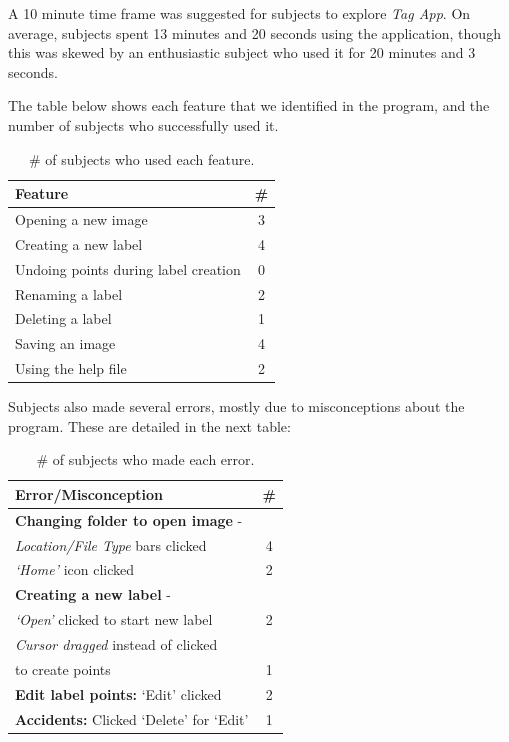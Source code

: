 \documentclass[11pt,twocolumn]{article}
\begin{document}
A 10 minute time frame was suggested for subjects to explore \emph{Tag App}. On average, subjects spent 13 minutes and 20 seconds using the application, though this was skewed by an enthusiastic subject who used it for 20 minutes and 3 seconds.

The table below shows each feature that we identified in the program, and the number of subjects who successfully used it.

\begin{table}[h!]
\centering
\begin{tabular}{|l|c|}
\hline
{\bf Feature } & {\bf \# } \\ 
\hline
Opening a new image & 3 \\
Creating a new label & 4 \\
Undoing points during label creation & 0 \\
Renaming a label & 2 \\
Deleting a label & 1 \\
Saving an image & 4 \\
Using the help file & 2 \\
\hline
\end{tabular}
\caption{\# of subjects who used each feature.}
\label{features}
\end{table}
 
Subjects also made several errors, mostly due to misconceptions about the program. These are detailed in the next table:

\begin{table}[h!]
\centering
\begin{tabular}{|l|c|}
\hline
{\bf Error/Misconception} & {\bf \#} \\
\hline
{\bf Changing folder to open image} - & \\
\emph{Location/File Type} bars clicked & 4 \\
\emph{`Home'} icon clicked & 2 \\
\hline
{\bf Creating a new label} - & \\
\emph{`Open'} clicked to start new label & 2 \\
\emph{Cursor dragged} instead of clicked & \\
to create points & 1 \\
\hline
{\bf Edit label points:} `Edit' clicked & 2 \\
\hline
{\bf Accidents:} Clicked `Delete' for `Edit' & 1 \\
\hline
\end{tabular}
\caption{\# of subjects who made each error.}
\label{errors}
\end{table}
\end{document}
